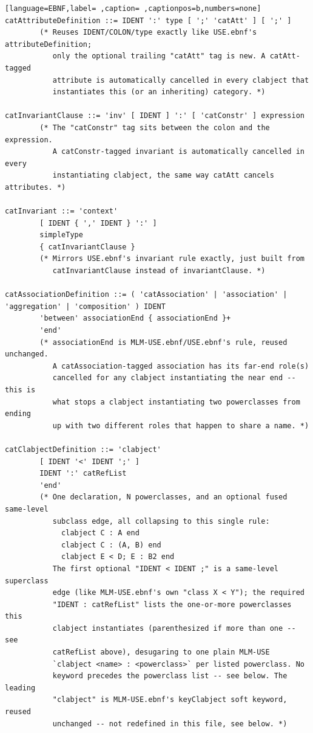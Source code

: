 \documentclass[11pt,twoside,a4paper]{book}
\begin{document}
\begin{lstlisting}[language=EBNF,label= ,caption= ,captionpos=b,numbers=none]
catAttributeDefinition ::= IDENT ':' type [ ';' 'catAtt' ] [ ';' ]
        (* Reuses IDENT/COLON/type exactly like USE.ebnf's attributeDefinition;
           only the optional trailing "catAtt" tag is new. A catAtt-tagged
           attribute is automatically cancelled in every clabject that
           instantiates this (or an inheriting) category. *)

catInvariantClause ::= 'inv' [ IDENT ] ':' [ 'catConstr' ] expression
        (* The "catConstr" tag sits between the colon and the expression.
           A catConstr-tagged invariant is automatically cancelled in every
           instantiating clabject, the same way catAtt cancels attributes. *)

catInvariant ::= 'context'
        [ IDENT { ',' IDENT } ':' ]
        simpleType
        { catInvariantClause }
        (* Mirrors USE.ebnf's invariant rule exactly, just built from
           catInvariantClause instead of invariantClause. *)

catAssociationDefinition ::= ( 'catAssociation' | 'association' | 'aggregation' | 'composition' ) IDENT
        'between' associationEnd { associationEnd }+
        'end'
        (* associationEnd is MLM-USE.ebnf/USE.ebnf's rule, reused unchanged.
           A catAssociation-tagged association has its far-end role(s)
           cancelled for any clabject instantiating the near end -- this is
           what stops a clabject instantiating two powerclasses from ending
           up with two different roles that happen to share a name. *)

catClabjectDefinition ::= 'clabject'
        [ IDENT '<' IDENT ';' ]
        IDENT ':' catRefList
        'end'
        (* One declaration, N powerclasses, and an optional fused same-level
           subclass edge, all collapsing to this single rule:
             clabject C : A end
             clabject C : (A, B) end
             clabject E < D; E : B2 end
           The first optional "IDENT < IDENT ;" is a same-level superclass
           edge (like MLM-USE.ebnf's own "class X < Y"); the required
           "IDENT : catRefList" lists the one-or-more powerclasses this
           clabject instantiates (parenthesized if more than one -- see
           catRefList above), desugaring to one plain MLM-USE
           `clabject <name> : <powerclass>` per listed powerclass. No
           keyword precedes the powerclass list -- see below. The leading
           "clabject" is MLM-USE.ebnf's keyClabject soft keyword, reused
           unchanged -- not redefined in this file, see below. *)


\end{lstlisting}
\end{document}

